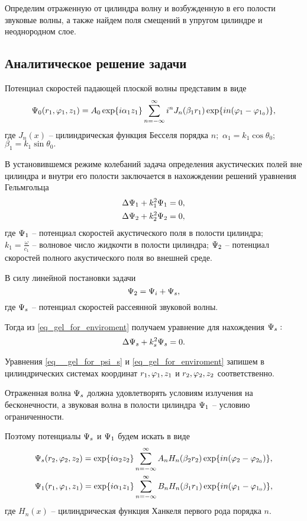 Определим отраженную от цилиндра волну и возбужденную в его полости звуковые волны, а также найдем поля смещений в упругом цилиндре и неоднородном слое.

\newpage
\subsection{Аналитическое решение задачи}

Потенциал скоростей падающей плоской волны представим в виде
$$\P_0(r_1, \f_1, z_1)=A_0\exp\{i\alpha_1 z_1\}\sum_{n=-\infty}^{\infty}i^nJ_n(\beta_1 r_1)\exp\{in(\f_1-\f_{1_0})\},$$
где $J_n(x)$ -- цилиндрическая функция Бесселя порядка $n;$ $\alpha_1=k_1\cos\theta_0;$ \\$\beta_1=k_1\sin\theta_0.$

В установившемся режиме колебаний задача определения акустических полей вне цилиндра и внутри его полости заключается в нахожждении решений уравнения Гельмгольца
\begin{align}
&\Lap\P_1+k_1^2\P_1=0,\\
&\Lap\P_2+k_2^2\P_2=0\label{eq_gel_for_enviroment},
\end{align}
где $\P_1$ -- потенциал скоростей акустического поля в полости цилиндра;\\ $k_1=\frac{\omega}{c_1}$ -- волновое число жидкочти в полости цилиндра;
$\P_{2}$ -- потенциал скоростей полного акустического поля во внешней среде. 

В силу линейной постановки задачи
\begin{equation}
\P_2=\P_i+\P_s,
\end{equation}
где $\P_s$ -- потенциал скоростей рассеянной звуковой волны.

Тогда из \eqref{eq_gel_for_enviroment} получаем уравнение для нахождения $\P_s:$
\begin{equation}\label{eq__gel_for_psi_s}
\Lap\P_s+k_s^2\P_s=0.
\end{equation}

Уравнения \eqref{eq__gel_for_psi_s} и \eqref{eq_gel_for_enviroment} запишем в цилиндрических системах координат $r_1, \f_1, z_1$ и $r_2, \f_2, z_2$ соответственно. 

Отраженная волна $\P_s$ должна удовлетворять условиям излучения на бесконечности, а звуковая волна в полости цилиндра $\P_1$ -- условию ограниченности.

Поэтому потенциалы $\P_s$ и $\P_1$ будем искать в виде
\begin{align}
&\P_s(r_2, \f_2, z_2)= \exp\{i\alpha_2 z_2\}\sum_{n=-\infty}^{\infty}A_nH_n(\beta_2 r_2)\exp\{in(\f_2-\f_{2_0})\},\\
&\P_1(r_1, \f_1, z_1)= \exp\{i\alpha_1 z_1\}\sum_{n=-\infty}^{\infty}B_nH_n(\beta_1 r_1)\exp\{in(\f_1-\f_{1_0})\},
\end{align}
где $H_n(x)$ -- цилиндрическая функция Ханкеля первого рода порядка $n.$

